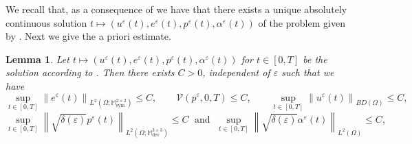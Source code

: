 \documentclass[reqno,10pt]{amsart}
\numberwithin{equation}{section}
\newtheorem{lemma}[theorem]{Lemma}
\theoremstyle{remark}
\newcommand{\M}{\mathbb{M}}
\newcommand{\calV}{\mathcal{V}}
\DeclareMathOperator{\dev}{dev}
\DeclareMathOperator{\sym}{sym}
\newcommand{\eps}{\varepsilon}
\begin{document}
We recall that, as a consequence of \cite[Theorem 3.5.2]{Mielke.Roubicek.2015} we have that there exists a unique absolutely continuous solution $t \mapsto (u^{\eps}(t), e^{\eps}(t), p^{\eps}(t), \alpha^{\eps}(t)) $ of the problem given by . 
Next we give the a priori estimate. 
\begin{lemma} \label{lema apriori estimates} 
Let $t \mapsto (u^\eps(t), e^\eps(t), p^\eps(t), \alpha^\eps(t))$ for $t \in [0,T]$ be the solution according to . Then there exists $C>0$, independent of $\eps$ such that we have 
\begin{equation} \label{eps-boundness in time 1}
	\sup_{t \in [0,T]} \left\|e^\eps(t)\right\|_{L^2(\Omega;\M^{2 \times 2}_{\sym})} \leq C, \qquad \calV(p^\eps, 0, T) \leq C, \qquad \sup_{t \in [0,T]} \left\|u^\eps(t)\right\|_{BD(\Omega)}\leq C,
\end{equation}
\begin{equation} \label{eps-boundness in time 4}
	\sup_{t \in [0,T]} \left\|\sqrt{\delta(\eps)} p^\eps(t)\right\|_{L^2(\Omega;\M^{3 \times 3}_{\dev})} \leq C \;\text{ and }\; \sup_{t \in [0,T]} \left\|\sqrt{\delta(\eps)} \alpha^\eps(t)\right\|_{L^2(\Omega)} \leq C,
\end{equation}
\end{lemma}
\end{document}
